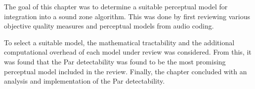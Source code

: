 The goal of this chapter was to determine a suitable perceptual model for integration into a sound zone algorithm.
This was done by first reviewing various objective quality measures and perceptual models from audio coding.

To select a suitable model, the mathematical tractability and the additional computational overhead of each model under
review was considered.
From this, it was found that the Par detectability was found to be the most promising perceptual model included in the
review.
Finally, the chapter concluded with an analysis and implementation of the Par detectability.

